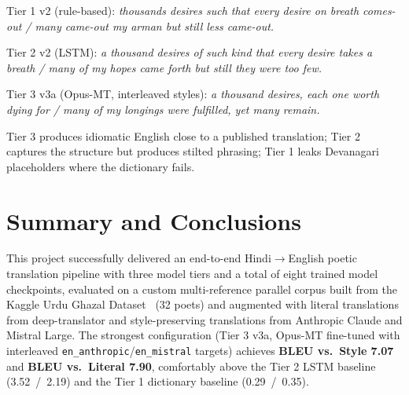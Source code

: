 \documentclass[11pt]{article}
\begin{document}
Tier 1 v2 (rule-based): \emph{thousands desires such that every desire on breath comes-out / many came-out my arman but still less came-out.}

Tier 2 v2 (LSTM): \emph{a thousand desires of such kind that every desire takes a breath / many of my hopes came forth but still they were too few.}

Tier 3 v3a (Opus-MT, interleaved styles): \emph{a thousand desires, each one worth dying for / many of my longings were fulfilled, yet many remain.}

Tier 3 produces idiomatic English close to a published translation; Tier 2 captures the structure but produces stilted phrasing; Tier 1 leaks Devanagari placeholders where the dictionary fails.

\section{Summary and Conclusions}

This project successfully delivered an end-to-end Hindi$\rightarrow$English poetic translation pipeline with three model tiers and a total of eight trained model checkpoints, evaluated on a custom multi-reference parallel corpus built from the Kaggle Urdu Ghazal Dataset~\cite{kaggle_ghazal} (32 poets) and augmented with literal translations from deep-translator and style-preserving translations from Anthropic Claude and Mistral Large. The strongest configuration (Tier 3 v3a, Opus-MT fine-tuned with interleaved \texttt{en\_anthropic}/\texttt{en\_mistral} targets) achieves \textbf{BLEU vs.\ Style 7.07} and \textbf{BLEU vs.\ Literal 7.90}, comfortably above the Tier 2 LSTM baseline (3.52~/~2.19) and the Tier 1 dictionary baseline (0.29~/~0.35).
\end{document}
